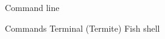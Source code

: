 \documentclass[12pt,a4paper,oneside]{article}
\begin{document}
    \centerline{\Large Command line}
  Commands
  Terminal (Termite)
  Fish shell
\end{document}
